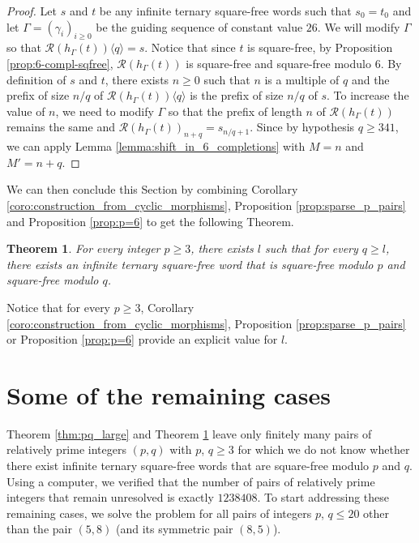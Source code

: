 \documentclass[12pt]{article}
\newtheorem{theorem}{Theorem}
\theoremstyle{definition}
\newcommand{\subsequence}[2]{#1\langle#2\rangle}
\begin{document}
\begin{proof}
Let $s$ and $t$ be any infinite ternary square-free words such that $s_0 = t_0$ and let $\Gamma = (\gamma_i)_{i \ge 0}$ be the guiding sequence of constant value $26$. We will modify $\Gamma$ so that $\subsequence{\mathcal{R}(h_\Gamma(t))}{q} = s$. Notice that since $t$ is square-free, by Proposition \ref{prop:6-compl-sqfree}, $\mathcal{R}(h_\Gamma(t))$ is square-free and square-free modulo $6$. By definition of $s$ and $t$, there exists $n \ge 0$ such that $n$ is a multiple of $q$ and the prefix of size $n/q$ of $\subsequence{\mathcal{R}(h_\Gamma(t))}{q}$ is the prefix of size $n/q$ of $s$. To increase the value of $n$, we need to modify $\Gamma$ so that the prefix of length $n$ of $\mathcal{R}(h_\Gamma(t))$ remains the same and $\mathcal{R}(h_\Gamma(t))_{n + q} = s_{n/q + 1}$. Since by hypothesis $q \ge 341$, we can apply Lemma \ref{lemma:shift_in_6_completions} with $M = n$ and $M' = n + q$.
\end{proof}

We can then conclude this Section by combining Corollary \ref{coro:construction_from_cyclic_morphisms}, Proposition \ref{prop:sparse_p_pairs} and Proposition \ref{prop:p=6} to get the following Theorem.

\begin{theorem}\label{thm:psmall_qlarge}
    For every integer $p \ge 3$, there exists $l$ such that for every $q \geq l$, there exists an infinite ternary square-free word that is square-free modulo $p$ and square-free modulo $q$.
\end{theorem}

Notice that for every $p \geq 3$, Corollary \ref{coro:construction_from_cyclic_morphisms}, Proposition \ref{prop:sparse_p_pairs} or Proposition \ref{prop:p=6} provide an explicit value for $l$.


\section{Some of the remaining cases}\label{sec:remaining_cases}


Theorem \ref{thm:pq_large} and Theorem \ref{thm:psmall_qlarge} leave only finitely many pairs of relatively prime integers $(p, q)$ with $p$, $q \ge 3$ for which we do not know whether there exist infinite ternary square-free words that are square-free modulo $p$ and $q$. Using a computer, we verified that the number of pairs of relatively prime integers that remain unresolved is exactly $1238408$. To start addressing these remaining cases, we solve the problem for all pairs of integers $p$, $q \leq 20$ other than the pair $(5, 8)$ (and its symmetric pair $(8, 5)$).
\end{document}
